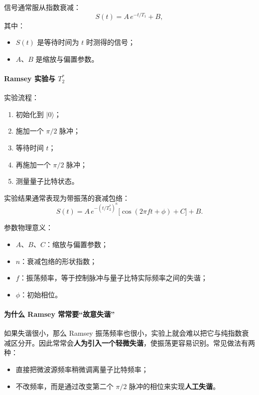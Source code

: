\documentclass[12pt,a4paper,oneside]{ctexbook}
\begin{document}
信号通常服从指数衰减：
\begin{equation}
S(t)=A\,e^{-t/T_1}+B,
\tag{53}
\end{equation}
其中：
\begin{itemize}
    \item \(S(t)\) 是等待时间为 \(t\) 时测得的信号；
    \item \(A\)、\(B\) 是缩放与偏置参数。
\end{itemize}

\paragraph{Ramsey 实验与 \(T_2^*\)}
实验流程：
\begin{enumerate}
    \item 初始化到 \(|0\rangle\)；
    \item 施加一个 \(\pi/2\) 脉冲；
    \item 等待时间 \(t\)；
    \item 再施加一个 \(\pi/2\) 脉冲；
    \item 测量量子比特状态。
\end{enumerate}

实验结果通常表现为带振荡的衰减包络：
\begin{equation}
S(t)
=
A\,e^{-(t/T_2^*)^n}
\bigl[\cos(2\pi f t+\phi)+C\bigr]+B.
\tag{54}
\end{equation}

参数物理意义：
\begin{itemize}
    \item \(A\)、\(B\)、\(C\)：缩放与偏置参数；
    \item \(n\)：衰减包络的形状指数；
    \item \(f\)：振荡频率，等于控制脉冲与量子比特实际频率之间的失谐；
    \item \(\phi\)：初始相位。
\end{itemize}

\paragraph{为什么 Ramsey 常常要“故意失谐”}
如果失谐很小，那么 Ramsey 振荡频率也很小，实验上就会难以把它与纯指数衰减区分开。因此常常会\textbf{人为引入一个轻微失谐}，使振荡更容易识别。常见做法有两种：
\begin{itemize}
    \item 直接把微波源频率稍微调离量子比特频率；
    \item 不改频率，而是通过改变第二个 \(\pi/2\) 脉冲的相位来实现\textbf{人工失谐}。
\end{itemize}
\end{document}
